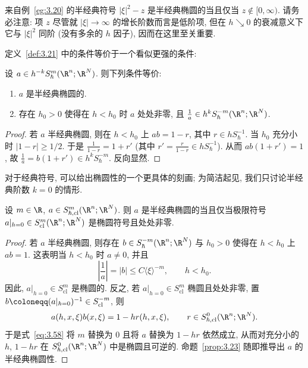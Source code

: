 \begin{example}[经典椭圆性与半经典椭圆性的对比]\label{eg:3.22}
来自例~\ref{eg:3.20} 的半经典符号 $|\xi|^2 - z$ 是半经典椭圆的当且仅当 $z \notin [0, \infty)$. 请务必注意: 项 $z$ 尽管就 $|\xi| \to \infty$ 的增长阶数而言是低阶项, 但在 $h \searrow 0$ 的衰减意义下它与 $|\xi|^2$ 同阶 (没有多余的 $h$ 因子), 因而在这里至关重要.
\end{example}

定义~\ref{def:3.21} 中的条件等价于一个看似更强的条件:

\begin{proposition}[半经典椭圆性的等价刻画]\label{prop:3.23}
设 $a \in h^{-k} S_\hbar^m(\R^n; \R^N)$. 则下列条件等价:
\begin{enumerate}
    \item $a$ 是半经典椭圆的.
    \item 存在 $h_0 > 0$ 使得在 $h < h_0$ 时 $a$ 处处非零, 且 $\frac{1}{a} \in h^k S_\hbar^{-m}(\R^n; \R^N)$.
\end{enumerate}
\end{proposition}

\begin{proof}
若 $a$ 半经典椭圆, 则在 $h < h_0$ 上 $a b = 1 - r$, 其中 $r \in h S_\hbar^{-1}$. 当 $h_0$ 充分小时 $|1 - r| \ge 1/2$. 于是 $\frac{1}{1-r} = 1 + r'$ (其中 $r' = \frac{r}{1-r} \in h S_\hbar^{-1}$). 从而 $a b (1 + r') = 1$, 故 $\frac{1}{a} = b(1 + r') \in h^k S_\hbar^{-m}$. 反向显然.
\end{proof}

对于经典符号, 可以给出椭圆性的一个更具体的刻画; 为简洁起见, 我们只讨论半经典阶数 $k = 0$ 的情形.

\begin{proposition}[经典半经典符号的椭圆性判定]\label{prop:3.24}
设 $m \in \R$, $a \in S_{\hbar, \mathrm{cl}}^m(\R^n; \R^N)$. 则 $a$ 是半经典椭圆的当且仅当极限符号 $a|_{h=0} \in S_{\mathrm{cl}}^m(\R^n; \R^N)$ 是椭圆符号且处处非零.
\end{proposition}

\begin{proof}
若 $a$ 半经典椭圆, 则存在 $b \in S_\hbar^{-m}(\R^n; \R^N)$ 与 $h_0 > 0$ 使得在 $h < h_0$ 上 $a b = 1$. 这表明当 $h < h_0$ 时 $a \neq 0$, 并且
\begin{equation}\label{eq:3.58}
    \left| \frac{1}{a} \right| = |b| \le C \langle \xi \rangle^{-m}, \qquad h < h_0.
\end{equation}
因此, $a|_{h=0} \in S_{\mathrm{cl}}^m$ 是椭圆的. 反之, 若 $a|_{h=0} \in S_{\mathrm{cl}}^m$ 椭圆且处处非零, 置 $b \defeq (a|_{h=0})^{-1} \in S_{\mathrm{cl}}^{-m}$, 则
\begin{equation}\label{eq:3.59}
    a(h, x, \xi) b(x, \xi) = 1 - h r(h, x, \xi), \qquad r \in S_{\hbar, \mathrm{cl}}^0(\R^n; \R^N).
\end{equation}
于是式~\eqref{eq:3.58} 将 $m$ 替换为 $0$ 且将 $a$ 替换为 $1 - h r$ 依然成立, 从而对充分小的 $h$, $1 - h r$ 在 $S_{\hbar, \mathrm{cl}}^0(\R^n; \R^N)$ 中是椭圆且可逆的. 命题~\ref{prop:3.23} 随即推导出 $a$ 的半经典椭圆性.
\end{proof}

